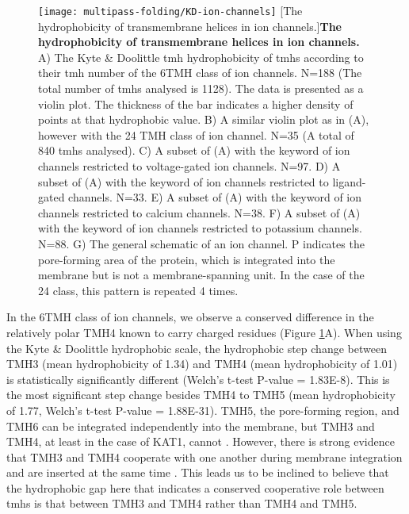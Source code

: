 \begin{figure}[!ht]
\centering
\texttt{[image: multipass-folding/KD-ion-channels]}
		[The hydrophobicity of transmembrane helices in ion channels.]{\textbf{The hydrophobicity of transmembrane helices in ion channels.}
    A) The Kyte \& Doolittle \gls{tmh} hydrophobicity of \gls{tmh}s according to their \gls{tmh} number of the 6TMH class of ion channels.
    N=188 (The total number of \gls{tmh}s analysed is 1128).
    The data is presented as a violin plot.
    The thickness of the bar indicates a higher density of points at that hydrophobic value.
    B) A similar violin plot as in (A), however with the 24 TMH class of ion channel.
    N=35 (A total of 840 \gls{tmh}s analysed).
    C) A subset of (A) with the keyword of ion channels restricted to voltage\--gated ion channels.
    N=97.
    D) A subset of (A) with the keyword of ion channels restricted to ligand\--gated channels.
    N=33.
    E) A subset of (A) with the keyword of ion channels restricted to calcium channels.
    N=38.
    F) A subset of (A) with the keyword of ion channels restricted to potassium channels.
    N=88.
    G) The general schematic of an ion channel.
    P indicates the pore\--forming area of the protein, which is integrated into the membrane but is not a membrane\--spanning unit.
    In the case of the 24 class, this pattern is repeated 4 times.
    }

\label{fig:KD-ion-channels}
\end{figure}

In the 6TMH class of ion channels, we observe a conserved difference in the relatively polar TMH4 known to carry charged residues (Figure \ref{fig:KD-ion-channels}A).
When using the Kyte \& Doolittle hydrophobic scale, the hydrophobic step change between TMH3 (mean hydrophobicity of 1.34) and TMH4 (mean hydrophobicity of 1.01) is statistically significantly different (Welch's t\--test P\--value = 1.83E-8).
This is the most significant step change besides TMH4 to TMH5 (mean hydrophobicity of 1.77, Welch's t\--test P\--value = 1.88E-31).
TMH5, the pore\--forming region, and TMH6 can be integrated independently into the membrane, but TMH3 and TMH4, at least in the case of KAT1, cannot \cite{Sato2002}.
However, there is strong evidence that TMH3 and TMH4 cooperate with one another during membrane integration and are inserted at the same time \cite{Sato2002, Sato2003, Zhang2007, Cymer2015}.
This leads us to be inclined to believe that the hydrophobic gap here that indicates a conserved cooperative role between \gls{tmh}s is that between TMH3 and TMH4 rather than TMH4 and TMH5.



